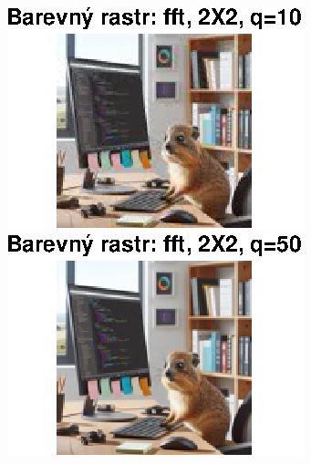 \begin{figure}[H]
    \centering
    \begin{minipage}[b]{0.3\textwidth}
        \centering
        \includegraphics[width=\textwidth]{images/barevny_fft_2X2_q10.eps}
    \end{minipage}
    \hfill
    \begin{minipage}[b]{0.3\textwidth}
        \centering
        \includegraphics[width=\textwidth]{images/barevny_fft_2X2_q50.eps}
    \end{minipage}
    \hfill
    \begin{minipage}[b]{0.3\textwidth}
        \centering

\end{minipage}
\end{figure}
